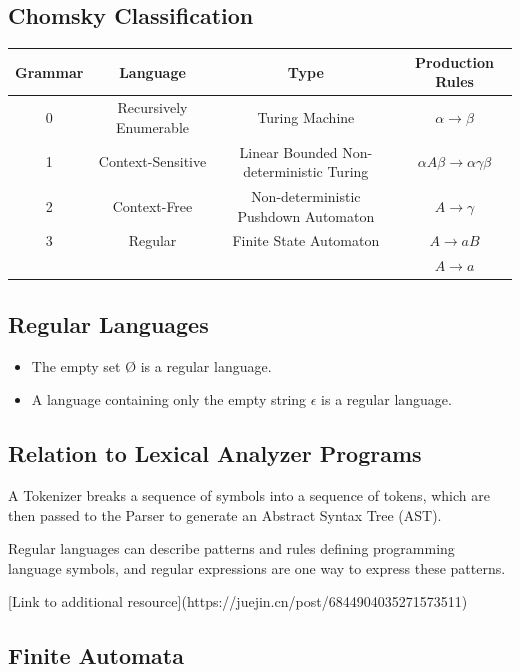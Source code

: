 \documentclass[11pt,journal,compsoc]{IEEEtran}
\begin{document}
\subsection{Chomsky Classification}

\begin{table}[H]
\centering
\begin{tabular}{|c|c|c|c|}
\hline
Grammar & Language & Type & Production Rules \\
\hline
0 & Recursively Enumerable & Turing Machine & $\alpha \rightarrow \beta$ \\
\hline
1 & Context-Sensitive & Linear Bounded Non-deterministic Turing & $\alpha A \beta \rightarrow \alpha \gamma \beta$ \\
\hline
2 & Context-Free & Non-deterministic Pushdown Automaton & $A \rightarrow \gamma$ \\
\hline
3 & Regular & Finite State Automaton & $A \rightarrow aB$ \\
& & & $A \rightarrow a$ \\
\hline
\end{tabular}
\end{table}


\subsection{Regular Languages}

\begin{itemize}
    \item The empty set Ø is a regular language.
    \item A language containing only the empty string $\epsilon$ is a regular language.
\end{itemize}


\subsection{Relation to Lexical Analyzer Programs}

A Tokenizer breaks a sequence of symbols into a sequence of tokens, which are then passed to the Parser to generate an Abstract Syntax Tree (AST).

Regular languages can describe patterns and rules defining programming language symbols, and regular expressions are one way to express these patterns.

[Link to additional resource](https://juejin.cn/post/6844904035271573511)


\subsection{Finite Automata}
\end{document}

